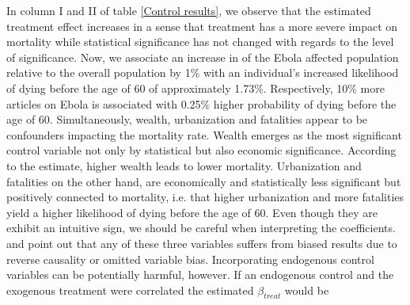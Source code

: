 \documentclass{article}
\begin{document}
In column I and II of table \ref{Control results}, we observe that the estimated treatment effect increases in a sense that treatment has a more severe impact on mortality while statistical significance has not changed with regards to the level of significance. Now, we associate an increase in of the Ebola affected population relative to the overall population by 1\% with an individual's increased likelihood of dying before the age of 60 of approximately 1.73\%. Respectively, 10\% more articles on Ebola is associated with 0.25\% higher probability of dying before the age of 60.
Simultaneously, wealth, urbanization and fatalities appear to be confounders impacting the mortality rate. Wealth emerges as the most significant control variable not only by statistical but also economic significance. According to the estimate, higher wealth leads to lower mortality. Urbanization and fatalities on the other hand, are economically and statistically less significant but positively connected to mortality, i.e. that higher urbanization and more fatalities yield a higher likelihood of dying before the age of 60. Even though they are exhibit an intuitive sign, we should be careful when interpreting the coefficients. \cite{cutler2006determinants} and \cite{gonzalez2017epidemics} point out that any of these three variables suffers from biased results due to reverse causality or omitted variable bias. Incorporating endogenous control variables can be potentially harmful, however. If an endogenous control and the exogenous treatment were correlated the estimated $\beta_{treat}$ would be 
\end{document}
